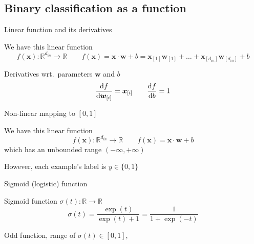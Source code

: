 \documentclass[12pt,aspectratio=169,handout]{beamer}
\begin{document}
\subsection{Binary classification as a function}

\begin{frame}{Linear function and its derivatives}
	
We have this linear function
$$f(\bm{x}) : \mathbb{R}^{d_{in}} \to \mathbb{R} \qquad
f(\bm{x}) = \bm{x} \cdot \bm{w} + b = \bm{x}_{[1]} \bm{w}_{[1]} + \ldots + \bm{x}_{[d_{in}]} \bm{w}_{[d_{in}]} + b $$

\begin{block}{Derivatives wrt.\ parameters $\bm{w}$ and $b$}
$$
\dv{f}{\bm{w}_{[i]}} = \bm{x}_{[i]} \qquad \dv{f}{b} = 1
$$
\end{block}


\end{frame}


\begin{frame}{Non-linear mapping to $[0, 1]$}

We have this linear function
$$f(\bm{x}) : \mathbb{R}^{d_{in}} \to \mathbb{R} \qquad
f(\bm{x}) = \bm{x} \cdot \bm{w} + b$$
which has an unbounded range $(-\infty, +\infty)$

\bigskip

However, each example's label is $y \in \{0, 1\}$

\end{frame}


\begin{frame}{Sigmoid (logistic) function}

\begin{block}{Sigmoid function $\sigma(t) : \mathbb{R} \to \mathbb{R}$}
	$$
	\sigma(t) = \frac{\exp(t)}{\exp(t) + 1} = \frac{1}{1 + \exp(-t)}
	$$
\end{block}


\begin{figure}
\end{figure}

Odd function, range of $\sigma(t) \in [0, 1]$, 

	
\end{frame}
\end{document}
